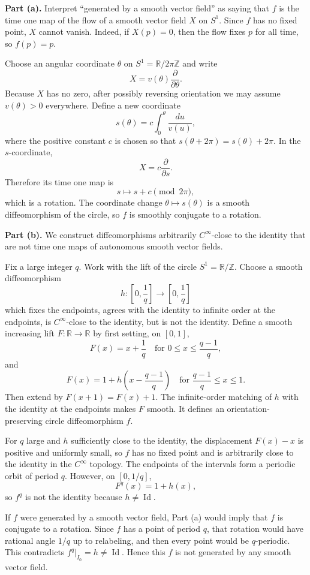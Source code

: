 \begin{solution}
\textbf{Part (a).}
Interpret ``generated by a smooth vector field'' as saying that $f$ is the time
one map of the flow of a smooth vector field $X$ on $S^1$. Since $f$ has no fixed
point, $X$ cannot vanish. Indeed, if $X(p)=0$, then the flow fixes $p$ for all
time, so $f(p)=p$.

Choose an angular coordinate $\theta$ on $S^1=\mathbb{R}/2\pi\mathbb{Z}$ and
write
\[
    X=v(\theta)\frac{\partial}{\partial\theta}.
\]
Because $X$ has no zero, after possibly reversing orientation we may assume
$v(\theta)>0$ everywhere. Define a new coordinate
\[
    s(\theta)
    =
    c\int_0^\theta \frac{du}{v(u)},
\]
where the positive constant $c$ is chosen so that $s(\theta+2\pi)=s(\theta)+2\pi$.
In the $s$-coordinate,
\[
    X=c\frac{\partial}{\partial s}.
\]
Therefore its time one map is
\[
    s\mapsto s+c \pmod{2\pi},
\]
which is a rotation. The coordinate change $\theta\mapsto s(\theta)$ is a smooth
diffeomorphism of the circle, so $f$ is smoothly conjugate to a rotation.

\textbf{Part (b).}
We construct diffeomorphisms arbitrarily $C^\infty$-close to the identity that
are not time one maps of autonomous smooth vector fields.

Fix a large integer $q$. Work with the lift of the circle
$S^1=\mathbb{R}/\mathbb{Z}$. Choose a smooth diffeomorphism
\[
    h:\left[0,\frac1q\right]\longrightarrow \left[0,\frac1q\right]
\]
which fixes the endpoints, agrees with the identity to infinite order at the
endpoints, is $C^\infty$-close to the identity, but is not the identity. Define a
smooth increasing lift $F:\mathbb{R}\to\mathbb{R}$ by first setting, on
$[0,1]$,
\[
    F(x)=x+\frac1q
    \quad
    \text{for }0\leq x\leq \frac{q-1}{q},
\]
and
\[
    F(x)=1+h\left(x-\frac{q-1}{q}\right)
    \quad
    \text{for }\frac{q-1}{q}\leq x\leq 1.
\]
Then extend by $F(x+1)=F(x)+1$. The infinite-order matching of $h$ with the
identity at the endpoints makes $F$ smooth. It defines an orientation-preserving
circle diffeomorphism $f$.

For $q$ large and $h$ sufficiently close to the identity, the displacement
$F(x)-x$ is positive and uniformly small, so $f$ has no fixed point and is
arbitrarily close to the identity in the $C^\infty$ topology. The endpoints of
the intervals form a periodic orbit of period $q$. However, on
$[0,1/q]$,
\[
    F^q(x)=1+h(x),
\]
so $f^q$ is not the identity because $h\neq\operatorname{Id}$.

If $f$ were generated by a smooth vector field, Part (a) would imply that $f$ is
conjugate to a rotation. Since $f$ has a point of period $q$, that rotation would
have rational angle $1/q$ up to relabeling, and then every point would be
$q$-periodic. This contradicts $f^q|_{I_0}=h\neq\operatorname{Id}$. Hence this
$f$ is not generated by any smooth vector field.
\end{solution}

